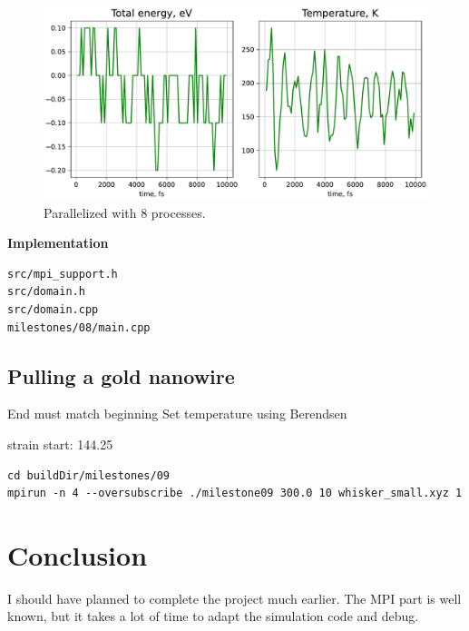 \documentclass[12pt,a4paper]{article}
\begin{document}
\begin{figure}[h!]
	\centering
	\includegraphics[width=.85\linewidth]{img/milestone08-8proc.pdf}
	\caption{Parallelized with 8 processes.}
	\label{fig:parallel-3}
\end{figure}

{\bf Implementation}
\begin{lstlisting}[breaklines]
src/mpi_support.h
src/domain.h
src/domain.cpp
milestones/08/main.cpp
\end{lstlisting}

\clearpage %

\subsection*{Pulling a gold nanowire}



End must match beginning
Set temperature using Berendsen


strain start: 144.25

\begin{lstlisting}[breaklines]
cd buildDir/milestones/09
mpirun -n 4 --oversubscribe ./milestone09 300.0 10 whisker_small.xyz 1
\end{lstlisting}


\section{Conclusion}
\label{conclusion}

I should have planned to complete the project much earlier. The MPI part is well known, but it takes a lot of time to adapt the simulation code and debug.

\newpage
{\small
	
	
}
\end{document}
